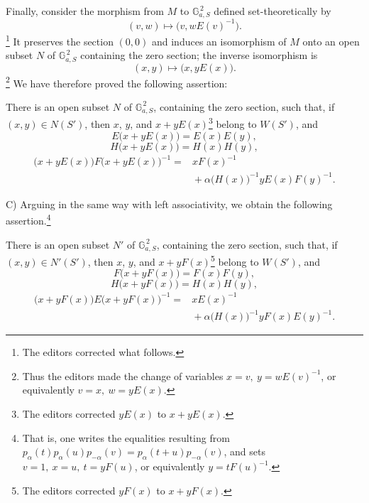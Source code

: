 Finally, consider the morphism from \(M\) to
\(\mathbb G_{a,S}^{\,2}\) defined set-theoretically by
\[
  (v,w)\longmapsto\bigl(v,wE(v)^{-1}\bigr).
\]
\footnote{The editors corrected what follows.}
It preserves the section \((0,0)\) and induces an isomorphism of
\(M\) onto an open subset \(N\) of
\(\mathbb G_{a,S}^{\,2}\) containing the zero section; the inverse
isomorphism is
\[
  (x,y)\longmapsto\bigl(x,yE(x)\bigr).
\]
\footnote{Thus the editors made the change of variables
\(x=v,\ y=wE(v)^{-1}\), or equivalently
\(v=x,\ w=yE(x)\).}
We have therefore proved the following assertion:

There is an open subset \(N\) of
\(\mathbb G_{a,S}^{\,2}\), containing the zero section, such that,
if \((x,y)\in N(S')\), then \(x\), \(y\), and
\(x+yE(x)\)\footnote{The editors corrected \(yE(x)\) to
\(x+yE(x)\).} belong to \(W(S')\), and
\begin{equation}\tag{1''}
  E\bigl(x+yE(x)\bigr)=E(x)E(y),
\end{equation}
\begin{equation}\tag{2''}
  H\bigl(x+yE(x)\bigr)=H(x)H(y),
\end{equation}
\begin{equation}\tag{3''}
\begin{split}
  \bigl(x+yE(x)\bigr)F\bigl(x+yE(x)\bigr)^{-1}
   ={}&xF(x)^{-1}\\
     &{}+\alpha\bigl(H(x)\bigr)^{-1}yE(x)F(y)^{-1}.
\end{split}
\end{equation}

\textup{C)} Arguing in the same way with left associativity, we
obtain the following assertion.\footnote{That is, one writes the
equalities resulting from
\(p_\alpha(t)p_\alpha(u)p_{-\alpha}(v)
  =p_\alpha(t+u)p_{-\alpha}(v)\), and sets
\(v=1,\ x=u,\ t=yF(u)\), or equivalently
\(y=tF(u)^{-1}\).}

There is an open subset \(N'\) of
\(\mathbb G_{a,S}^{\,2}\), containing the zero section, such that,
if \((x,y)\in N'(S')\), then \(x\), \(y\), and
\(x+yF(x)\)\footnote{The editors corrected \(yF(x)\) to
\(x+yF(x)\).} belong to \(W(S')\), and
\begin{equation}\tag{4''}
  F\bigl(x+yF(x)\bigr)=F(x)F(y),
\end{equation}
\begin{equation}\tag{5''}
  H\bigl(x+yF(x)\bigr)=H(x)H(y),
\end{equation}
\begin{equation}\tag{6''}
\begin{split}
  \bigl(x+yF(x)\bigr)E\bigl(x+yF(x)\bigr)^{-1}
   ={}&xE(x)^{-1}\\
     &{}+\alpha\bigl(H(x)\bigr)^{-1}yF(x)E(y)^{-1}.
\end{split}
\end{equation}

